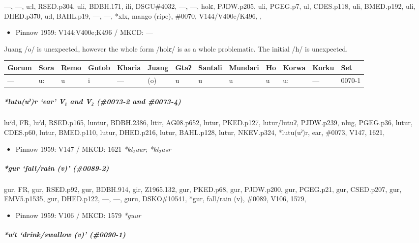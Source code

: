 \documentclass[a4paper,]{article}
\providecommand{\tightlist}{%
  \setlength{\itemsep}{0pt}\setlength{\parskip}{0pt}}
\let\oldsubparagraph\subparagraph
\renewcommand{\subparagraph}[1]{\oldsubparagraph{#1}\mbox{}}
\begin{document}
---, ---, u:l, RSED.p304, uli, BDBH.171, ili, DSGU\#4032, ---, ---,
holɛ, PJDW.p205, uli, PGEG.p7, ul, CDES.p118, uli, BMED.p192, uli,
DHED.p370, u:l, BAHL.p19, ---, ---, *xlx, mango (ripe), \#0070,
V144/V400e/K496, ,

\begin{itemize}
\tightlist
\item
  Pinnow 1959: V144;V400e;K496 / MKCD: ---
\end{itemize}

Juang /o/ is unexpected, however the whole form /holɛ/ is as a whole
problematic. The initial /h/ is unexpected.

\begin{longtable}[]{@{}lllllllllllll@{}}
\toprule
Gorum & Sora & Remo & Gutob & Kharia & Juang & Gtaʔ & Santali & Mundari
& Ho & Korwa & Korku & Set\tabularnewline
\midrule
\endhead
--- & u: & u & i & --- & (o) & u & u & u & u & u: & --- &
0070-1\tabularnewline
\bottomrule
\end{longtable}

\subparagraph{\texorpdfstring{\emph{*lutu(uˀ)r} `ear' V₁ and V₂
(\#0073-2 and
\#0073-4)}{*lutu(uˀ)r ear V₁ and V₂ (\#0073-2 and \#0073-4)}}\label{lutuuux2c0r-ear-v-and-v-0073-2-and-0073-4}

luˀd, FR, luˀd, RSED.p165, luntur, BDBH.2386, litir, AG08.p652, lutur,
PKED.p127, lutur/lutuʔ, PJDW.p239, nlug, PGEG.p36, lutur, CDES.p60,
lutur, BMED.p110, lutur, DHED.p216, lutur, BAHL.p128, lutur, NKEV.p324,
*lutu(uˀ)r, ear, \#0073, V147, 1621,

\begin{itemize}
\tightlist
\item
  Pinnow 1959: V147 / MKCD: 1621 \emph{*kt₂uur}; \emph{*kt₂uər}
\end{itemize}

\subparagraph{\texorpdfstring{\emph{*gur} `fall/rain (v)'
(\#0089-2)}{*gur fall/rain (v) (\#0089-2)}}\label{gur-fallrain-v-0089-2}

gur, FR, gur, RSED.p92, gur, BDBH.914, gir, Z1965.132, gur, PKED.p68,
gur, PJDW.p200, gur, PGEG.p21, gur, CSED.p207, gur, EMV5.p1535, gur,
DHED.p122, ---, ---, guru, DSKO\#10541, *gur, fall/rain (v), \#0089,
V106, 1579,

\begin{itemize}
\tightlist
\item
  Pinnow 1959: V106 / MKCD: 1579 \emph{*guur}
\end{itemize}

\subparagraph{\texorpdfstring{\emph{*uˀt} `drink/swallow (v)'
(\#0090-1)}{*uˀt drink/swallow (v) (\#0090-1)}}\label{uux2c0t-drinkswallow-v-0090-1}
\end{document}
